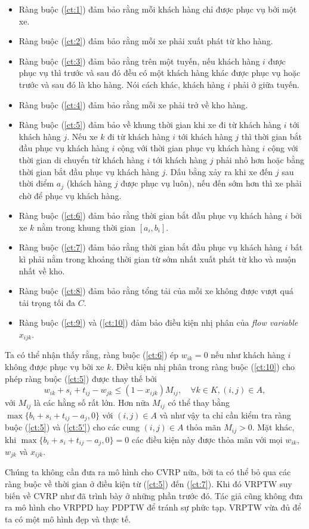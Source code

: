 \begin{itemize}
	\item Ràng buộc (\ref{ct:1}) đảm bảo rằng mỗi khách hàng chỉ được phục vụ bởi một xe.
	\item Ràng buộc (\ref{ct:2}) đảm bảo rằng mỗi xe phải xuất phát từ kho hàng.
	\item Ràng buộc (\ref{ct:3}) đảm bảo rằng trên một tuyến, nếu khách hàng $i$ được phục vụ thì trước và sau đó đều có một khách hàng khác được phục vụ hoặc trước và sau đó là kho hàng. Nói cách khác, khách hàng $i$ phải ở giữa tuyến.
	\item Ràng buộc (\ref{ct:4}) đảm bảo rằng mỗi xe phải trở về kho hàng.
	\item Ràng buộc (\ref{ct:5}) đảm bảo về khung thời gian khi xe đi từ khách hàng $i$ tới khách hàng $j$. Nếu xe $k$ đi từ khách hàng $i$ tới khách hàng $j$ thì thời gian bắt đầu phục vụ khách hàng $i$ cộng với thời gian phục vụ khách hàng $i$ cộng với thời gian di chuyển từ khách hàng $i$ tới khách hàng $j$ phải nhỏ hơn hoặc bằng thời gian bắt đầu phục vụ khách hàng $j$. Dấu bằng xảy ra khi xe đến $j$ sau thời điểm $a_j$ (khách hàng $j$ được phục vụ luôn), nếu đến sớm hơn thì xe phải chờ để phục vụ khách hàng.
	\item Ràng buộc (\ref{ct:6}) đảm bảo rằng thời gian bắt đầu phục vụ khách hàng $i$ bởi xe $k$ nằm trong khung thời gian $[a_i, b_i]$.
	\item Ràng buộc (\ref{ct:7}) đảm bảo rằng thời gian bắt đầu phục vụ khách hàng $i$ bất kì phải nằm trong khoảng thời gian từ sớm nhất xuất phát từ kho và muộn nhất về kho.
	\item Ràng buộc (\ref{ct:8}) đảm bảo rằng tổng tải của mỗi xe không được vượt quá tải trọng tối đa $C$.
	\item Ràng buộc (\ref{ct:9}) và (\ref{ct:10}) đảm bảo điều kiện nhị phân của \textit{flow variable} $x_{ijk}$.
\end{itemize}

Ta có thể nhận thấy rằng, ràng buộc (\ref{ct:6}) ép $w_{ik} = 0$ nếu như khách hàng $i$ không được phục vụ bởi xe $k$. Điều kiện nhị phân trong ràng buộc (\ref{ct:10}) cho phép ràng buộc (\ref{ct:5}) được thay thế bởi
\begin{equation}
	\label{ct:5'}
	w_{ik} + s_i + t_{ij} - w_{jk} \leq (1 - x_{ijk}) M_{ij}, \quad \forall k \in K, (i,j) \in A,
\end{equation}
với $M_{ij}$ là các hằng số rất lớn. Hơn nữa $M_{ij}$ có thể thay bằng $\max \{b_i + s_i + t_{ij} - a_j, 0\}$ với $(i,j) \in A$ và như vậy ta chỉ cần kiểm tra ràng buộc (\ref{ct:5}) và (\ref{ct:5'}) cho các cung $(i, j) \in A$ thỏa mãn $M_{ij} > 0$. Mặt khác, khi $\max \{b_i + s_i + t_{ij} - a_j, 0\} = 0$ các điều kiện này được thỏa mãn với mọi $w_{ik}$, $w_{jk}$ và $x_{ijk}$.

Chúng ta không cần đưa ra mô hình cho CVRP nữa, bởi ta có thể bỏ qua các ràng buộc về thời gian ở điều kiện từ (\ref{ct:5}) đến (\ref{ct:7}). Khi đó VRPTW suy biến về CVRP như đã trình bày ở những phần trước đó. Tác giả cũng không đưa ra mô hình cho VRPPD hay PDPTW để tránh sự phức tạp. VRPTW vừa đủ để ta có một mô hình đẹp và thực tế.